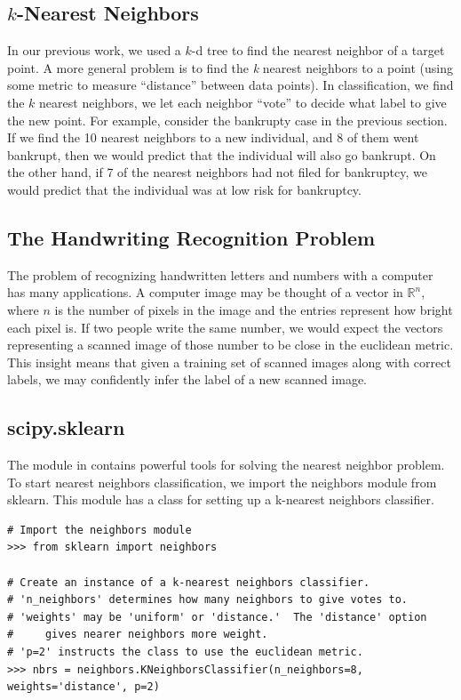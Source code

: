 \subsection*{$k$-Nearest Neighbors}

In our previous work, we used a $k$-d tree to find the nearest neighbor of a target point.
A more general problem is to find the \emph{k} nearest neighbors to a point (using some metric to measure ``distance'' between data points).
In classification, we find the $k$ nearest neighbors, we let each neighbor ``vote'' to decide what label to give the new point.
For example, consider the bankrupty case in the previous section.
If we find the 10 nearest neighbors to a new individual, and 8 of them went bankrupt, then we would predict that the individual will also go bankrupt.
On the other hand, if 7 of the nearest neighbors had not filed for bankruptcy, we would predict that the individual was at low risk for bankruptcy.

\subsection*{The Handwriting Recognition Problem}

The problem of recognizing handwritten letters and numbers with a computer has many applications.
A computer image may be thought of a vector in $\mathbb{R}^n$, where $n$ is the number of pixels in the image and the entries represent how bright each pixel is.
If two people write the same number, we would expect the vectors representing a scanned image of those number to be close in the euclidean metric.
This insight means that given a training set of scanned images along with correct labels, we may confidently infer the label of a new scanned image.

\subsection*{scipy.sklearn}

The  module in  contains powerful tools for solving the nearest neighbor problem.
To start nearest neighbors classification, we import the neighbors module from sklearn.
This module has a class for setting up a k-nearest neighbors classifier.
\begin{lstlisting}
# Import the neighbors module
>>> from sklearn import neighbors

# Create an instance of a k-nearest neighbors classifier.
# 'n_neighbors' determines how many neighbors to give votes to.
# 'weights' may be 'uniform' or 'distance.'  The 'distance' option
#     gives nearer neighbors more weight.
# 'p=2' instructs the class to use the euclidean metric.
>>> nbrs = neighbors.KNeighborsClassifier(n_neighbors=8, weights='distance', p=2)
\end{lstlisting}

